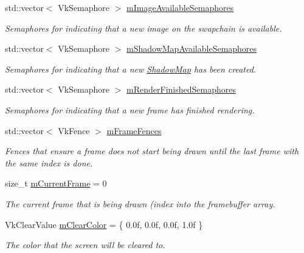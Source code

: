 \begin{DoxyCompactItemize}
std\+::vector$<$ Vk\+Semaphore $>$ \mbox{\hyperlink{class_render_system_ab8bf79f6f6de8fab7126a4a02f8afa20}{m\+Image\+Available\+Semaphores}}
\begin{DoxyCompactList}\small\item\em Semaphores for indicating that a new image on the swapchain is available. \end{DoxyCompactList}\item 
\mbox{\label{class_render_system_ab43f42732cf10c16e8b5f54c793758fb}} 
std\+::vector$<$ Vk\+Semaphore $>$ \mbox{\hyperlink{class_render_system_ab43f42732cf10c16e8b5f54c793758fb}{m\+Shadow\+Map\+Available\+Semaphores}}
\begin{DoxyCompactList}\small\item\em Semaphores for indicating that a new \mbox{\hyperlink{struct_shadow_map}{Shadow\+Map}} has been created. \end{DoxyCompactList}\item 
\mbox{\label{class_render_system_ae54f53003fcabea0932fcb5b859ec4b5}} 
std\+::vector$<$ Vk\+Semaphore $>$ \mbox{\hyperlink{class_render_system_ae54f53003fcabea0932fcb5b859ec4b5}{m\+Render\+Finished\+Semaphores}}
\begin{DoxyCompactList}\small\item\em Semaphores for indicating that a new frame has finished rendering. \end{DoxyCompactList}\item 
\mbox{\label{class_render_system_a2ae483ee5eca6f400b08b0cf4ff295a5}} 
std\+::vector$<$ Vk\+Fence $>$ \mbox{\hyperlink{class_render_system_a2ae483ee5eca6f400b08b0cf4ff295a5}{m\+Frame\+Fences}}
\begin{DoxyCompactList}\small\item\em Fences that ensure a frame does not start being drawn until the last frame with the same index is done. \end{DoxyCompactList}\item 
\mbox{\label{class_render_system_ade8699ab15bb365a8ba30f398644e08b}} 
size\+\_\+t \mbox{\hyperlink{class_render_system_ade8699ab15bb365a8ba30f398644e08b}{m\+Current\+Frame}} = 0
\begin{DoxyCompactList}\small\item\em The current frame that is being drawn (index into the framebuffer array. \end{DoxyCompactList}\item 
\mbox{\label{class_render_system_ac27ef13631dad64e0036a2d6b1aab9cf}} 
Vk\+Clear\+Value \mbox{\hyperlink{class_render_system_ac27ef13631dad64e0036a2d6b1aab9cf}{m\+Clear\+Color}} = \{ 0.\+0f, 0.\+0f, 0.\+0f, 1.\+0f \}
\begin{DoxyCompactList}\small\item\em The color that the screen will be cleared to. \end{DoxyCompactList}\end{DoxyCompactItemize}
